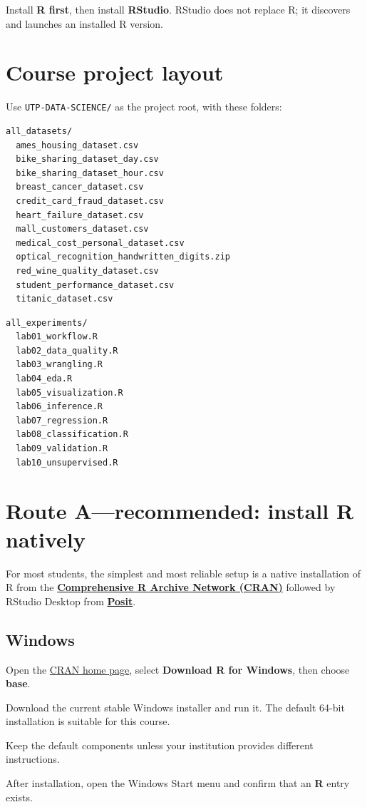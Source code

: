 \begin{keyidea}
Install \textbf{R first}, then install \textbf{RStudio}. RStudio does not replace R; it discovers and launches an installed R version.
\end{keyidea}

\section{Course project layout}
Use \texttt{UTP-DATA-SCIENCE/} as the project root, with these folders:

\noindent
\begin{minipage}[t]{0.49\linewidth}
\begin{lstlisting}[style=mlterminal]
all_datasets/
  ames_housing_dataset.csv
  bike_sharing_dataset_day.csv
  bike_sharing_dataset_hour.csv
  breast_cancer_dataset.csv
  credit_card_fraud_dataset.csv
  heart_failure_dataset.csv
  mall_customers_dataset.csv
  medical_cost_personal_dataset.csv
  optical_recognition_handwritten_digits.zip
  red_wine_quality_dataset.csv
  student_performance_dataset.csv
  titanic_dataset.csv
\end{lstlisting}
\end{minipage}\hfill
\begin{minipage}[t]{0.49\linewidth}
\begin{lstlisting}[style=mlterminal]
all_experiments/
  lab01_workflow.R
  lab02_data_quality.R
  lab03_wrangling.R
  lab04_eda.R
  lab05_visualization.R
  lab06_inference.R
  lab07_regression.R
  lab08_classification.R
  lab09_validation.R
  lab10_unsupervised.R
\end{lstlisting}
\end{minipage}

\section{Route A---recommended: install R natively}

For most students, the simplest and most reliable setup is a native installation of R from the \href{https://cran.r-project.org/}{\textbf{Comprehensive R Archive Network (CRAN)}} followed by RStudio Desktop from \href{https://posit.co/download/rstudio-desktop/}{\textbf{Posit}}.

\subsection{Windows}

\begin{mlsteps}
  \item Open the \href{https://cran.r-project.org/}{CRAN home page}, select \textbf{Download R for Windows}, then choose \textbf{base}.
  \item Download the current stable Windows installer and run it. The default 64-bit installation is suitable for this course.
  \item Keep the default components unless your institution provides different instructions.
  \item After installation, open the Windows Start menu and confirm that an \textbf{R} entry exists.
\end{mlsteps}

